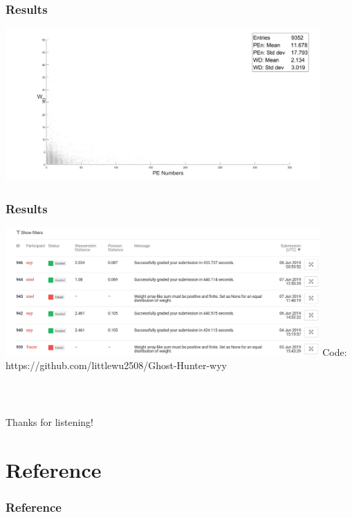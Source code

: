 \documentclass{beamer}
\begin{document}
\begin{frame}
    \frametitle{Results}
    \large
    \includegraphics[width = 0.9\textwidth]{s_WD.png}
\end{frame}

\begin{frame}
    \frametitle{Results}
    \large
    \includegraphics[width = 0.9\textwidth]{grades.png}
    Code: https://github.com/littlewu2508/Ghost-Hunter-wyy
\end{frame}

\begin{frame}
    \frametitle{\ }
    \Huge
    \centering
    Thanks for listening!
\end{frame}

\section{Reference}
\begin{frame}
    \frametitle{Reference}
    \large
    
\end{frame}
\end{document}
